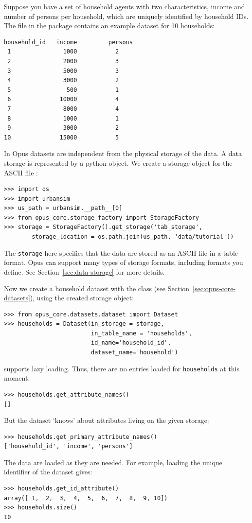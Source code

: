 Suppose you have a set of household agents  with two characteristics, income
and number of persons per household, which are uniquely identified by
household IDs. The file  in the 
package contains an example dataset for 10 households:
\begin{verbatim}
household_id   income         persons
 1               1000           2
 2               2000           3
 3               5000           3
 4               3000           2
 5                500           1
 6              10000           4
 7               8000           4
 8               1000           1
 9               3000           2
10              15000           5
\end{verbatim}

In Opus datasets are independent from the physical storage of the data. A data storage
is represented by a python object. We create a storage object for the ASCII file :

 \label{storagepage}
\begin{verbatim}
>>> import os
>>> import urbansim
>>> us_path = urbansim.__path__[0]
>>> from opus_core.storage_factory import StorageFactory
>>> storage = StorageFactory().get_storage('tab_storage',
        storage_location = os.path.join(us_path, 'data/tutorial'))
\end{verbatim}

The \verb|storage| here specifies that the data
are stored as an ASCII file in a table format. 
Opus can support many types of storage formats, including formats you define. See Section~\ref{sec:data-storage}
for more details.

Now we create a household dataset with the  class  
(see Section~\ref{sec:opus-core-datasets}), using the created
storage object:
\begin{verbatim}
>>> from opus_core.datasets.dataset import Dataset
>>> households = Dataset(in_storage = storage,
                         in_table_name = 'households', 
                         id_name='household_id',
                         dataset_name='household')
\end{verbatim}

 supports lazy loading. Thus, there are no entries
loaded for \verb|households| at this moment:
\begin{verbatim}
>>> households.get_attribute_names()
[]
\end{verbatim}
But the dataset `knows' about attributes living on the given storage:
\begin{verbatim}
>>> households.get_primary_attribute_names()
['household_id', 'income', 'persons']
\end{verbatim}
The data are loaded as they are needed. For example, loading the
unique identifier of the dataset gives:
\begin{verbatim}
>>> households.get_id_attribute()
array([ 1,  2,  3,  4,  5,  6,  7,  8,  9, 10])
>>> households.size()
10
\end{verbatim}

